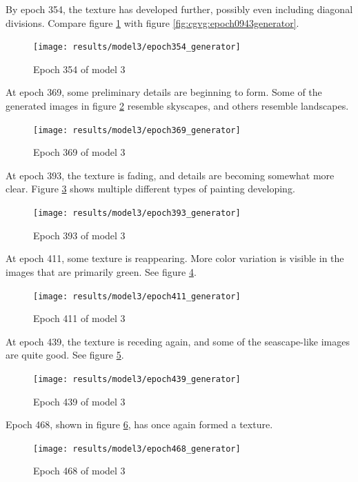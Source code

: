 \documentclass[11pt,letterpaper]{article}
\begin{document}
				By epoch 354, the texture has developed further, possibly even including diagonal divisions.
				Compare figure \ref{fig:cgm:epoch354generator} with figure \ref{fig:cgvg:epoch0943generator}.
				\begin{figure}
					\centering
					\texttt{[image: results/model3/epoch354\_generator]}
					\caption[]{Epoch 354 of model 3}
					\label{fig:cgm:epoch354generator}
				\end{figure}

				At epoch 369, some preliminary details are beginning to form.
				Some of the generated images in figure \ref{fig:cgm:epoch369generator} resemble skyscapes, and others resemble landscapes.
				\begin{figure}
					\centering
					\texttt{[image: results/model3/epoch369\_generator]}
					\caption[]{Epoch 369 of model 3}
					\label{fig:cgm:epoch369generator}
				\end{figure}

				At epoch 393, the texture is fading, and details are becoming somewhat more clear.
				Figure \ref{fig:cgm:epoch393generator} shows multiple different types of painting developing.
				\begin{figure}
					\centering
					\texttt{[image: results/model3/epoch393\_generator]}
					\caption[]{Epoch 393 of model 3}
					\label{fig:cgm:epoch393generator}
				\end{figure}

				At epoch 411, some texture is reappearing.
				More color variation is visible in the images that are primarily green.
				See figure \ref{fig:cgm:epoch411generator}.
				\begin{figure}
					\centering
					\texttt{[image: results/model3/epoch411\_generator]}
					\caption[]{Epoch 411 of model 3}
					\label{fig:cgm:epoch411generator}
				\end{figure}

				At epoch 439, the texture is receding again, and some of the seascape-like images are quite good.
				See figure \ref{fig:cgm:epoch439generator}.
				\begin{figure}
					\centering
					\texttt{[image: results/model3/epoch439\_generator]}
					\caption[]{Epoch 439 of model 3}
					\label{fig:cgm:epoch439generator}
				\end{figure}

				Epoch 468, shown in figure \ref{fig:cgm:epoch468generator}, has once again formed a texture.
				\begin{figure}
					\centering
					\texttt{[image: results/model3/epoch468\_generator]}
					\caption[]{Epoch 468 of model 3}
					\label{fig:cgm:epoch468generator}
				\end{figure}
\end{document}
